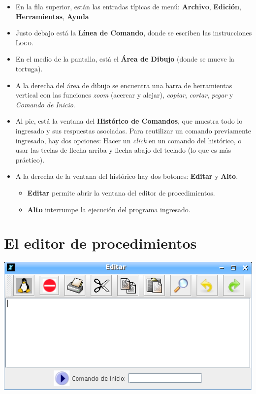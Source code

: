 \begin{itemize}
   \item En la fila superior, est\'an las entradas t\'ipicas de men\'u:
      \textbf{Archivo}, \textbf{Edici\'on}, \textbf{Herramientas},
      \textbf{Ayuda}
   \item Justo debajo est\'a la 
      \textbf{L\'inea de Comando},
      donde se escriben las instrucciones \textsc{Logo}.
   \item En el medio de la pantalla, est\'a el
      \textbf{\'Area de Dibujo} 
      (donde se mueve la tortuga).
   \item A la derecha del \'area de dibujo se encuentra una barra de
      herramientas vertical con las funciones \textit{zoom}
      (acercar y alejar), \textit{copiar},
      \textit{cortar}, \textit{pegar} y
      \textit{Comando de Inicio}.
   \item Al pie, est\'a la ventana del
      \textbf{Hist\'orico de Comandos},
      que muestra todo lo ingresado y sus respuestas asociadas. Para
      reutilizar un comando previamente ingresado, hay dos opciones:
      Hacer un \textit{click} en un comando del hist\'orico, o usar
      las teclas de flecha arriba y flecha abajo del teclado (lo que
      es m\'as pr\'actico).
   \item A la derecha de la ventana del hist\'orico hay dos botones:
      \textbf{Editar} y \textbf{Alto}. 
      \begin{itemize}
         \item \textbf{Editar}  permite abrir la ventana del
            editor de procedimientos. 
         \item \textbf{Alto}  interrumpe la ejecuci\'on del
            programa ingresado.
      \end{itemize}
\end{itemize}

\section{El editor de procedimientos}
   \label{EditorProcedimientos}

\begin{center}
   \includegraphics[scale=0.5]
      {Imagenes/02_Caracteristicas/EditorProc_092.png}
\end{center}

